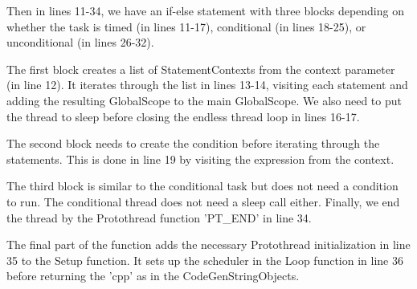 Then in lines 11-34, we have an if-else statement with three blocks depending on whether the task is timed (in lines 11-17), conditional (in lines 18-25), or unconditional (in lines 26-32).

The first block creates a list of StatementContexts from the context parameter (in line 12). It iterates through the list in lines 13-14, visiting each statement and adding the resulting GlobalScope to the main GlobalScope. We also need to put the thread to sleep before closing the endless thread loop in lines 16-17.

The second block needs to create the condition before iterating through the statements. This is done in line 19 by visiting the expression from the context.

The third block is similar to the conditional task but does not need a condition to run. The conditional thread does not need a sleep call either. Finally, we end the thread by the Protothread function 'PT\_END' in line 34.

The final part of the function adds the necessary Protothread initialization in line 35 to the Setup function. It sets up the scheduler in the Loop function in line 36 before returning the 'cpp' as in the CodeGenStringObjects.
